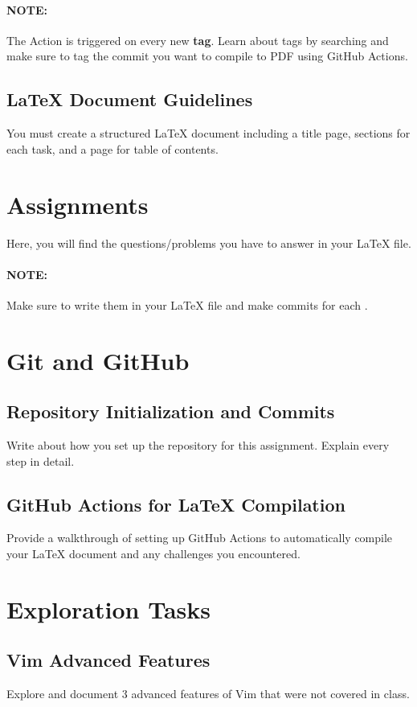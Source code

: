 \documentclass[12pt]{article}
\begin{document}
\paragraph{NOTE:} The Action is triggered on every new \textbf{tag}. Learn about tags by searching and make sure to tag the commit you want to compile to PDF using
GitHub Actions.

\subsection*{LaTeX Document Guidelines}
You must create a structured LaTeX document including a title page, sections for each task, and a page for table of contents.


\pagebreak


\section*{Assignments}
Here, you will find the questions/problems you have to answer in your LaTeX file.
\paragraph{NOTE:} Make sure to write them in your LaTeX file and make commits for each .

\section{Git and GitHub}
\subsection{Repository Initialization and Commits}
Write about how you set up the repository for this assignment. Explain every step in detail.

\subsection{GitHub Actions for LaTeX Compilation}
Provide a walkthrough of setting up GitHub Actions to automatically compile your LaTeX document and any challenges you encountered.


\section{Exploration Tasks}
\subsection{Vim Advanced Features}
Explore and document 3 advanced features of Vim that were not covered in class.
\end{document}
